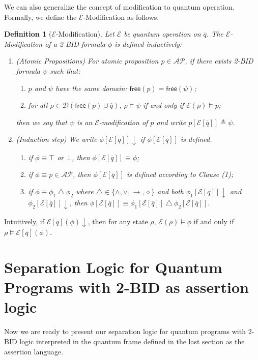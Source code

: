 \documentclass[conference,compsoc, 10pt]{IEEEtran}
\newtheorem{definition}{Definition}[section]
\newcommand {\qbar} {{\overline{q}}}
\newcommand {\cD } {{\mathcal{D}}}
\newcommand {\cE } {{\mathcal{E}}}
\newcommand{\Mexist}{{\downarrow}}
\newcommand {\V }[1] {{\mathsf{free}{\left(#1\right)}}}
\newcommand {\AP} {{\mathcal{AP}}}
\newcommand{\sd}{\diamond}%
\begin{document}
\begin{appendices}
		
		We can also generalize the concept of modification to quantum operation. Formally, we define the $\cE$-Modification as follows:
		\begin{definition}[$\cE$-Modification]
			\label{def qo modification 2BID}
			Let $\cE$ be quantum operation on $\qbar$. The $\cE$-Modification of a 2-BID formula $\phi$ is defined inductively:
			\begin{enumerate}
				\item (Atomic Propositions) For atomic proposition $p\in\AP$, if there exists 2-BID formula $\psi$ such that:
				\begin{enumerate}
					\item $p$ and $\psi$ have the same domain: $\V{p} = \V{\psi}$;
					\item for all $\rho\in\cD(\V{p}\cup\qbar)$, $\rho\models \psi$ if and only if $\cE(\rho)\models p$;
				\end{enumerate}
				then we say that $\psi$ is an $\cE$-modification of $p$ and write  $p[\cE[\qbar]]\triangleq\psi$.
				\item (Induction step) We write $\phi[\cE[\qbar]]\Mexist$ if $\phi[\cE[\qbar]]$ is defined.
				\begin{enumerate}			
					\item if $\phi\equiv \top$ or $\bot$, then $\phi[\cE[\qbar]] \equiv \phi$;
					\item if $\phi\equiv p\in\AP$, then $\phi[\cE[\qbar]]$ is defined according to Clause {\rm (1)};
					\item if $\phi\equiv \phi_1\ \triangle\ \phi_2$ where $\triangle\in\{ \wedge,\vee,\rightarrow, \sd\}$ and both $\phi_1[\cE[\qbar]]\Mexist$ and $\phi_2[\cE[\qbar]]\Mexist$, then $\phi[\cE[\qbar]]\equiv\phi_1[\cE[\qbar]] \ \triangle\ \phi_2[\cE[\qbar]].$
				\end{enumerate}
			\end{enumerate}
		\end{definition}
		Intuitively, if $\cE[\qbar](\phi)\Mexist$, then for any state $\rho$, $\cE(\rho)\models\phi$ if and only if $\rho\models \cE[\qbar](\phi)$.
		
		\section{Separation Logic for Quantum Programs with 2-BID as assertion logic}
		\label{sec QSL 2BID}
		
		Now we are ready to present our separation logic for quantum programs with 2-BID logic interpreted in the quantum frame defined in the last section as the assertion language. 
		

\end{appendices}
\end{document}
